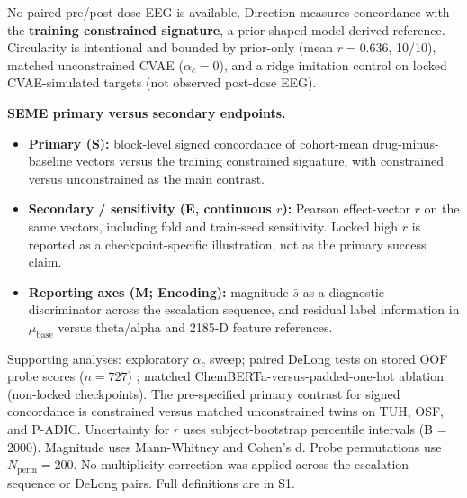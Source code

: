 No paired pre/post-dose EEG is available. Direction measures concordance with the \textbf{training constrained signature}, a prior-shaped model-derived reference. Circularity is intentional and bounded by prior-only (mean \(r=0.636\), 10/10), matched unconstrained CVAE (\(\alpha_c=0\)), and a ridge imitation control on locked CVAE-simulated targets (not observed post-dose EEG).

\noindent\textbf{SEME primary versus secondary endpoints.}
\begin{itemize}
  \item \textbf{Primary (S):} block-level signed concordance of cohort-mean drug-minus-baseline vectors versus the training constrained signature, with constrained versus unconstrained as the main contrast.
  \item \textbf{Secondary / sensitivity (E, continuous \(r\)):} Pearson effect-vector \(r\) on the same vectors, including fold and train-seed sensitivity. Locked high \(r\) is reported as a checkpoint-specific illustration, not as the primary success claim.
  \item \textbf{Reporting axes (M; Encoding):} magnitude \(\bar{s}\) as a diagnostic discriminator across the escalation sequence, and residual label information in \(\mu_{\mathrm{base}}\) versus theta/alpha and 2185-D feature references.
\end{itemize}
Supporting analyses: exploratory \(\alpha_c\) sweep; paired DeLong tests on stored OOF probe scores (\(n=727\)) \citep{DeLong1988}; matched ChemBERTa-versus-padded-one-hot ablation (non-locked checkpoints). The pre-specified primary contrast for signed concordance is constrained versus matched unconstrained twins on TUH, OSF, and P-ADIC. Uncertainty for \(r\) uses subject-bootstrap percentile intervals (B = 2000). Magnitude uses Mann-Whitney and Cohen's d. Probe permutations use \(N_{\mathrm{perm}}=200\). No multiplicity correction was applied across the escalation sequence or DeLong pairs. Full definitions are in S1.
